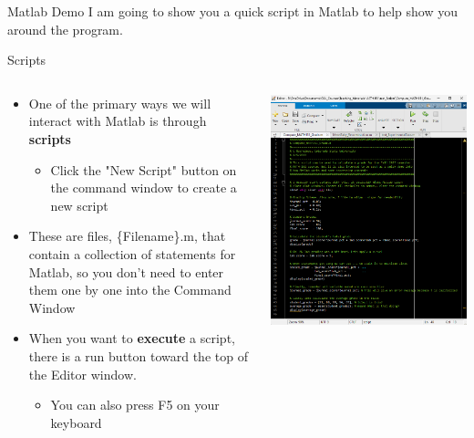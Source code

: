 {}\documentclass[letterpaper,
compress,
xcolor=x11names,
]{beamer}
\begin{document}
\begin{frame}{Matlab Demo}
	I am going to show you a quick script in Matlab to help show you around the program.
\end{frame}
\begin{frame}{Scripts}
	\footnotesize
	\begin{columns}
		\begin{column}{0.5\linewidth}
			\begin{itemize}
				\item One of the primary ways we will interact with Matlab is through \textbf{scripts}
				\begin{itemize}
					\scriptsize
					\item Click the "New Script" button on the command window to create a new script
				\end{itemize}
				\item These are files, \{Filename\}.m, that contain a collection of statements for Matlab, so you don't need to enter them one by one into the Command Window
				\item When you want to \textbf{execute} a script, there is a run button toward the top of the Editor window.
				\begin{itemize}
					\scriptsize
					\item You can also press F5 on your keyboard
				\end{itemize}
			\end{itemize}
		\end{column}
		\begin{column}{0.5\linewidth}
			\includegraphics[width = \linewidth]{Script_example.png}
		\end{column}
	\end{columns}
\end{frame}
\end{document}
